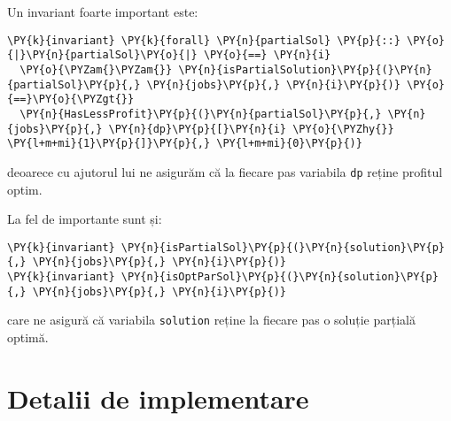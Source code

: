 Un invariant foarte important este:
\begin{Verbatim}[commandchars=\\\{\}, fontsize=\footnotesize]
\PY{k}{invariant} \PY{k}{forall} \PY{n}{partialSol} \PY{p}{::} \PY{o}{|}\PY{n}{partialSol}\PY{o}{|} \PY{o}{==} \PY{n}{i}
  \PY{o}{\PYZam{}\PYZam{}} \PY{n}{isPartialSolution}\PY{p}{(}\PY{n}{partialSol}\PY{p}{,} \PY{n}{jobs}\PY{p}{,} \PY{n}{i}\PY{p}{)} \PY{o}{==}\PY{o}{\PYZgt{}} 
  \PY{n}{HasLessProfit}\PY{p}{(}\PY{n}{partialSol}\PY{p}{,} \PY{n}{jobs}\PY{p}{,} \PY{n}{dp}\PY{p}{[}\PY{n}{i} \PY{o}{\PYZhy{}} \PY{l+m+mi}{1}\PY{p}{]}\PY{p}{,} \PY{l+m+mi}{0}\PY{p}{)}
\end{Verbatim}
deoarece cu ajutorul lui ne asigurăm că la fiecare pas variabila \texttt{dp} reține profitul optim. 

La fel de importante sunt și:
\begin{Verbatim}[commandchars=\\\{\}, fontsize=\footnotesize]
\PY{k}{invariant} \PY{n}{isPartialSol}\PY{p}{(}\PY{n}{solution}\PY{p}{,} \PY{n}{jobs}\PY{p}{,} \PY{n}{i}\PY{p}{)}
\PY{k}{invariant} \PY{n}{isOptParSol}\PY{p}{(}\PY{n}{solution}\PY{p}{,} \PY{n}{jobs}\PY{p}{,} \PY{n}{i}\PY{p}{)}
\end{Verbatim}
care ne asigură că variabila \texttt{solution} reține la fiecare pas o soluție parțială optimă. \\

\section{Detalii de implementare}

